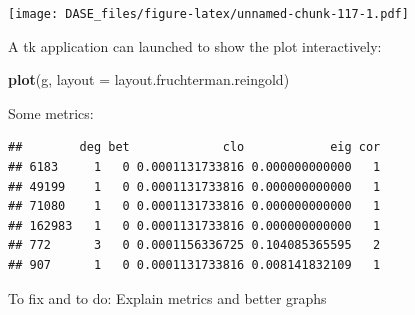 \documentclass[]{book}
\newenvironment{Shaded}{\begin{snugshade}}{\end{snugshade}}
\newcommand{\KeywordTok}[1]{\textcolor[rgb]{0.13,0.29,0.53}{\textbf{{#1}}}}
\newcommand{\DataTypeTok}[1]{\textcolor[rgb]{0.13,0.29,0.53}{{#1}}}
\newcommand{\StringTok}[1]{\textcolor[rgb]{0.31,0.60,0.02}{{#1}}}
\newcommand{\CommentTok}[1]{\textcolor[rgb]{0.56,0.35,0.01}{\textit{{#1}}}}
\newcommand{\NormalTok}[1]{{#1}}
\begin{document}
\texttt{[image: DASE\_files/figure-latex/unnamed-chunk-117-1.pdf]}

A tk application can launched to show the plot interactively:

\begin{Shaded}
\begin{Highlighting}[]
\KeywordTok{plot}\NormalTok{(g, }\DataTypeTok{layout =} \NormalTok{layout.fruchterman.reingold)}
\end{Highlighting}
\end{Shaded}

Some metrics:

\begin{Shaded}
\end{Shaded}

\begin{verbatim}
##        deg bet             clo            eig cor
## 6183     1   0 0.0001131733816 0.000000000000   1
## 49199    1   0 0.0001131733816 0.000000000000   1
## 71080    1   0 0.0001131733816 0.000000000000   1
## 162983   1   0 0.0001131733816 0.000000000000   1
## 772      3   0 0.0001156336725 0.104085365595   2
## 907      1   0 0.0001131733816 0.008141832109   1
\end{verbatim}

To fix and to do: Explain metrics and better graphs
\end{document}
